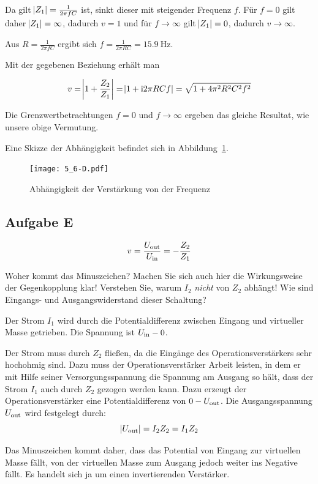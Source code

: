Da gilt $\abs{Z_1}=\frac 1{2\pi fC}$ ist, sinkt dieser mit steigender Frequenz
$f$. Für $f = 0$ gilt daher $\abs{Z_1} = \infty$, dadurch $v = 1$ und für $f
\to \infty$ gilt $\abs{Z_1} = 0$, dadurch $v \to \infty$.

Aus $R = \frac 1{2\pi fC}$ ergibt sich $f = \frac 1{2\pi RC} =
\SI{15.9}{\hertz}$.

Mit der gegebenen Beziehung erhält man

\[
    v = \abs{1 + \frac {Z_2}{Z_1}} = \abs{1 + \mathrm i 2\pi RC f} = \sqrt{1 +
    4\pi^2R^2C^2 f^2} 
\]

Die Grenzwertbetrachtungen $f = 0$ und $f \to \infty$ ergeben das gleiche
Resultat, wie unsere obige Vermutung.

Eine Skizze der Abhängigkeit befindet sich in Abbildung~\ref{fig:5_6-D}.

\begin{figure}[htbp]
    \centering
    \texttt{[image: 5\_6-D.pdf]}
    \caption{%
        Abhängigkeit der Verstärkung von der Frequenz
    }
    \label{fig:5_6-D}
\end{figure}

\FloatBarrier
\subsection{Aufgabe E}

\begin{problem}
	\[
		v = \frac{U_\text{out}}{U_\text{in}} = - \frac{Z_2}{Z_1}
	\]

	Woher kommt das Minuszeichen? Machen Sie sich auch hier die Wirkungsweise
	der Gegenkopplung klar! Verstehen Sie, warum $I_2$ \emph{nicht} von $Z_2$
	abhängt! Wie sind Eingangs- und Ausgangswiderstand dieser Schaltung?
\end{problem}

Der Strom $I_1$ wird durch die Potentialdifferenz zwischen Eingang und
virtueller Masse getrieben. Die Spannung ist $U_\text{in} - 0$.

Der Strom muss durch $Z_2$ fließen, da die Eingänge des Operationsverstärkers
sehr hochohmig sind. Dazu muss der Operationsverstärker Arbeit leisten, in dem
er mit Hilfe seiner Versorgungsspannung die Spannung am Ausgang so hält, dass
der Strom $I_1$ auch durch $Z_2$ gezogen werden kann. Dazu erzeugt der
Operationsverstärker eine Potentialdifferenz von $0 - U_\text{out}$. Die
Ausgangsspannung $U_\text{out}$ wird festgelegt durch:
\[
	|U_\text{out}| = I_2 Z_2 = I_1 Z_2
\]

Das Minuszeichen kommt daher, dass das Potential von Eingang zur virtuellen
Masse fällt, von der virtuellen Masse zum Ausgang jedoch weiter ins Negative
fällt. Es handelt sich ja um einen invertierenden Verstärker.

